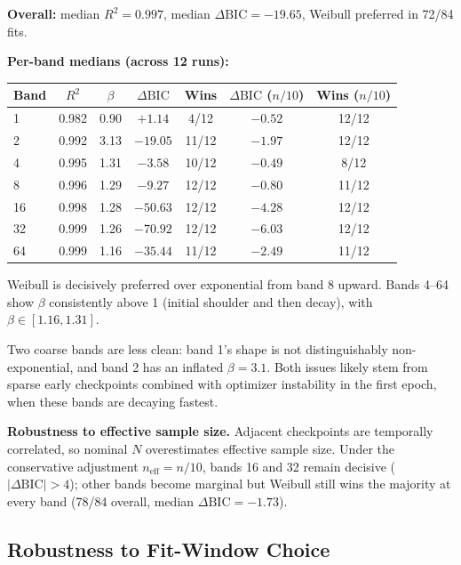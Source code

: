 \documentclass{article}
\begin{document}
\textbf{Overall:} median $R^2 = 0.997$, median $\Delta\mathrm{BIC} = -19.65$, Weibull
preferred in 72/84 fits.

\textbf{Per-band medians (across 12 runs):}

\begin{center}
\small
\begin{tabular}{@{}lcccccc@{}}
\toprule
Band & $R^2$ & $\beta$ & $\Delta\mathrm{BIC}$ & Wins & $\Delta\mathrm{BIC}$ ($n/10$) & Wins ($n/10$) \\
\midrule
1  & 0.982 & 0.90 & $+1.14$  & 4/12  & $-0.52$ & 12/12 \\
2  & 0.992 & 3.13 & $-19.05$ & 11/12 & $-1.97$ & 12/12 \\
4  & 0.995 & 1.31 & $-3.58$  & 10/12 & $-0.49$ & 8/12 \\
8  & 0.996 & 1.29 & $-9.27$  & 12/12 & $-0.80$ & 11/12 \\
16 & 0.998 & 1.28 & $-50.63$ & 12/12 & $-4.28$ & 12/12 \\
32 & 0.999 & 1.26 & $-70.92$ & 12/12 & $-6.03$ & 12/12 \\
64 & 0.999 & 1.16 & $-35.44$ & 11/12 & $-2.49$ & 11/12 \\
\bottomrule
\end{tabular}
\end{center}

Weibull is decisively preferred over exponential from band 8 upward.
Bands 4--64 show $\beta$ consistently above 1 (initial shoulder and then
decay), with $\beta \in [1.16, 1.31]$.

Two coarse bands are less clean: band 1's shape is not distinguishably
non-exponential, and band 2 has an inflated $\beta = 3.1$. Both issues likely
stem from sparse early checkpoints combined with optimizer instability
in the first epoch, when these bands are decaying fastest.

\textbf{Robustness to effective sample size.} Adjacent checkpoints are
temporally correlated, so nominal $N$ overestimates effective sample size.
Under the conservative adjustment $n_{\mathrm{eff}} = n/10$, bands 16 and 32 remain
decisive ($|\Delta\mathrm{BIC}| > 4$); other bands become
marginal but Weibull still wins the majority at every band (78/84
overall, median $\Delta\mathrm{BIC} = -1.73$).

\subsection{Robustness to Fit-Window Choice}\label{app:fit-window-robustness}
\end{document}

